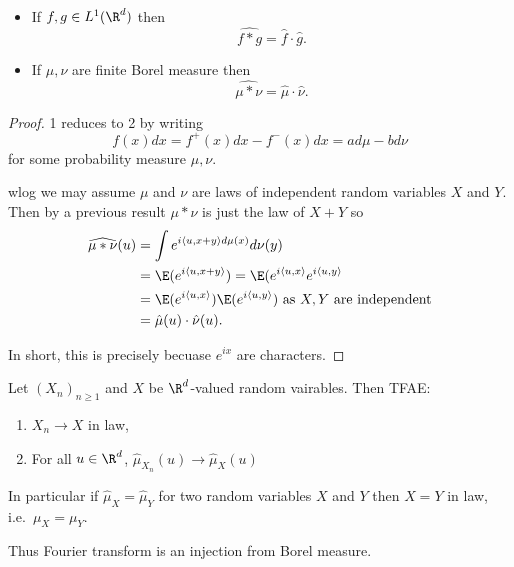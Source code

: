 \documentclass[a4paper]{article}
\begin{document}
\begin{proposition}\leavevmode
  \begin{itemize}
  \item If \(f, g \in L^1(\R^d)\) then
    \[
      \widehat{f * g} = \hat f \cdot \hat g.
    \]
  \item If \(\mu, \nu\) are finite Borel measure then
    \[
      \widehat{\mu * \nu} = \hat \mu \cdot \hat \nu.
    \]
  \end{itemize}
\end{proposition}

\begin{proof}
  1 reduces to 2 by writing
  \[
    f(x) dx = f^+(x) dx - f^-(x) dx = a d\mu - b d\nu
  \]
  for some probability measure \(\mu, \nu\).

  wlog we may assume \(\mu\) and \(\nu\) are laws of independent random variables \(X\) and \(Y\). Then by a previous result \(\mu * \nu\) is just the law of \(X + Y\) so
  \begin{align*}
    \widehat{\mu * \nu}(u)
    &= \int e^{i \langle u, x + y \rangle d\mu(x)} d\nu(y) \\
    &= \E(e^{i \langle u, x+ y \rangle}) = \E(e^{i \langle u, x \rangle} e^{i \langle u, y \rangle} \\
    &= \E(e^{i \langle u, x \rangle}) \E(e^{i \langle u, y \rangle}) \text{ as \(X, Y\) are independent} \\
    &= \hat \mu(u) \cdot \hat \nu(u).
  \end{align*}

  In short, this is precisely becuase \(e^{i x}\) are characters.
\end{proof}

\begin{theorem}
  Let \((X_n)_{n \geq 1}\) and \(X\) be \(\R^d\)-valued random vairables. Then TFAE:
  \begin{enumerate}
  \item \(X_n \to X\) in law,
  \item For all \(u \in \R^d\), \(\hat \mu_{X_n}(u) \to \hat \mu_X(u)\)
  \end{enumerate}
  In particular if \(\hat \mu_X = \hat \mu_Y\) for two random variables \(X\) and \(Y\) then \(X = Y\) in law, i.e.\ \(\mu_X = \mu_Y\).
\end{theorem}

Thus Fourier transform is an injection from Borel measure.
\end{document}
